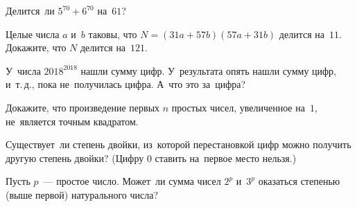 


\begingroup
    \ifdefined\threedotcolon
        \def\kratno{\mathrel{\threedotcolon}}%
    \fi

\begin{problems}


\item
Делится~ли $5^{70} + 6^{70}$ на~$61$?

\item
Целые числа $a$ и~$b$ таковы, что $N = (31 a + 57 b) (57 a + 31 b)$
делится на~$11$.
Докажите, что $N$ делится на~$121$.

\item
У~числа $2018^{2018}$ нашли сумму цифр.
У~результата опять нашли сумму цифр, и~т.\,д., пока не~получилась цифра.
А~что это за~цифра?

\item
Докажите, что произведение первых $n$ простых чисел, увеличенное на~$1$,
не~является точным квадратом.




\item
Существует~ли степень двойки, из~которой перестановкой цифр можно получить
другую степень двойки?
(Цифру 0 ставить на~первое место нельзя.)

\item
Пусть $p$~--- простое число.
Может~ли сумма чисел $2^{p}$ и~$3^{p}$ оказаться степенью (выше первой)
натурального числа?


\end{problems}
